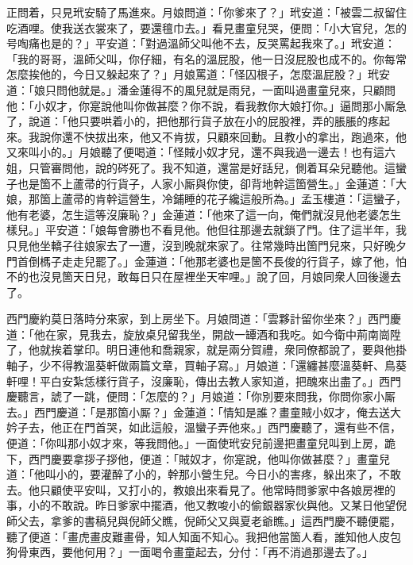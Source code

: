 正問着，只見玳安騎了馬進來。月娘問道：「你爹來了？」玳安道：「被雲二叔留住吃酒哩。使我送衣裳來了，要還氊巾去。」看見畫童兒哭，便問：「小大官兒，怎的号啕痛也是的？」平安道：「對過溫師父叫他不去，反哭罵起我來了。」玳安道：「我的哥哥，溫師父叫，你仔細，有名的溫屁股，他一日沒屁股也成不的。你每常怎麼挨他的，今日又躲起來了？」{}月娘罵道：「怪囚根子，怎麼溫屁股？」玳安道：「娘只問他就是。」潘金蓮得不的風兒就是雨兒，{}一面叫過畫童兒來，只顧問他：「小奴才，你寔說他叫你做甚麼？你不說，看我教你大娘打你。」逼問那小厮急了，說道：「他只要哄着小的，把他那行貨子放在小的屁股裡，弄的脹脹的疼起來。我說你還不快拔出來，他又不肯拔，只顧來回動。且教小的拿出，跑過來，他又來叫小的。」月娘聽了便喝道：「怪賊小奴才兒，還不與我過一邊去！也有這六姐，只管審問他，說的硶死了。我不知道，還當是好話兒，側着耳朵兒聽他。這蠻子也是箇不上蘆帚的行貨子，人家小厮與你使，卻背地幹這箇營生。」金蓮道：「大娘，那箇上蘆帚的肯幹這營生，{}冷鋪睡的花子纔這般所為。」{}孟玉樓道：「這蠻子，他有老婆，怎生這等沒廉恥？」金蓮道：「他來了這一向，俺們就沒見他老婆怎生樣兒。」平安道：「娘每會勝也不看見他。他但往那邊去就鎖了門。住了這半年，我只見他坐轎子往娘家去了一遭，沒到晚就來家了。往常幾時出箇門兒來，只好晚夕門首倒榪子走走兒罷了。」金蓮道：「他那老婆也是箇不長俊的行貨子，嫁了他，怕不的也沒見箇天日兒，敢每日只在屋裡坐天牢哩。」說了回，月娘同衆人回後邊去了。

西門慶約莫日落時分來家，到上房坐下。月娘問道：「雲夥計留你坐來？」西門慶道：「他在家，見我去，旋放桌兒留我坐，開啟一罈酒和我吃。如今衛中荊南崗陞了，他就挨着掌印。明日連他和喬親家，就是兩分賀禮，衆同僚都說了，要與他掛軸子，少不得教溫葵軒做兩篇文章，買軸子寫。」月娘道：「還纏甚麼溫葵軒、鳥葵軒哩！平白安紮恁樣行貨子，沒廉恥，傳出去教人家知道，把醜來出盡了。」西門慶聽言，諕了一跳，{}便問：「怎麼的？」月娘道：「你別要來問我，你問你家小厮去。」西門慶道：「是那箇小厮？」金蓮道：「情知是誰？畫童賊小奴才，俺去送大妗子去，他正在門首哭，如此這般，溫蠻子弄他來。」西門慶聽了，還有些不信，便道：「你叫那小奴才來，等我問他。」一面使玳安兒前邊把畫童兒叫到上房，跪下，西門慶要拿拶子拶他，{}便道：「賊奴才，你寔說，他叫你做甚麼？」畫童兒道：「他叫小的，要灌醉了小的，幹那小營生兒。{}今日小的害疼，躲出來了，不敢去。他只顧使平安叫，又打小的，教娘出來看見了。他常時問爹家中各娘房裡的事，小的不敢說。昨日爹家中擺酒，他又教唆小的偷銀器家伙與他。又某日他望倪師父去，拿爹的書稿兒與倪師父瞧，倪師父又與夏老爺瞧。」這西門慶不聽便罷，聽了便道：「畫虎畫皮難畫骨，知人知面不知心。我把他當箇人看，誰知他人皮包狗骨東西，要他何用？」{}一面喝令畫童起去，分付：「再不消過那邊去了。」

